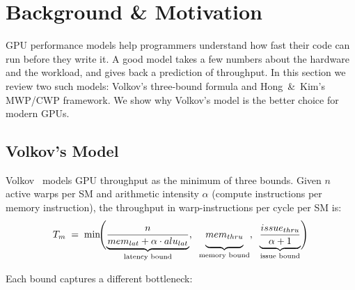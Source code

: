 

\section{Background \& Motivation}
\label{sec:background}

GPU performance models help programmers understand how fast their code can run
before they write it.
A good model takes a few numbers about the hardware and the workload,
and gives back a prediction of throughput.
In this section we review two such models: Volkov's three-bound formula
and Hong~\&~Kim's MWP/CWP framework.
We show why Volkov's model is the better choice for modern GPUs.

\subsection{Volkov's Model}
\label{subsec:volkov_model}

Volkov~\cite{volkov2016understanding} models GPU throughput as the minimum of
three bounds.
Given $n$ active warps per SM and arithmetic intensity $\alpha$ (compute
instructions per memory instruction), the throughput in warp-instructions
per cycle per SM is:
%
\begin{equation}
T_m \;=\; \min\!\Biggl(
  \underbrace{\frac{n}{mem_{lat} + \alpha \cdot alu_{lat}}}_{\text{latency bound}},\;\;
  \underbrace{mem_{thru}\vphantom{\frac{n}{1}}}_{\text{memory bound}},\;\;
  \underbrace{\frac{issue_{thru}}{\alpha + 1}}_{\text{issue bound}}
\Biggr)
\label{eq:volkov}
\end{equation}

Each bound captures a different bottleneck:

